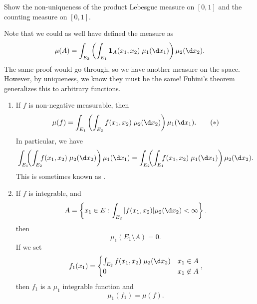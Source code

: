\documentclass[a4paper]{article}
\begin{document}
\begin{ex}
  Show the non-uniqueness of the product Lebesgue measure on $[0, 1]$ and the counting measure on $[0, 1]$.
\end{ex}

Note that we could as well have defined the measure as
\[
  \mu(A) = \int_{E_2} \left(\int_{E_1} \mathbf{1}_A(x_1, x_2)\;\mu_1(\d x_1)\right)\mu_2(\d x_2).
\]
The same proof would go through, so we have another measure on the space. However, by uniqueness, we know they must be the same! Fubini's theorem generalizes this to arbitrary functions.
\begin{thm}\leavevmode
  \begin{enumerate}
    \item If $f$ is non-negative measurable, then
      \[
        \mu(f) = \int_{E_1} \left(\int_{E_2} f(x_1, x_2)\; \mu_2(\d x_2)\right)\mu_1(\d x_1).\tag{$*$}
      \]
      In particular, we have
      \[
        \int_{E_1}\!\!\!\left(\int_{E_2}\!\!\! f(x_1, x_2)\; \mu_2(\d x_2)\right)\mu_1(\d x_1) = \int_{E_2}\!\!\!\left(\int_{E_1}\!\!\!f(x_1, x_2)\; \mu_1(\d x_1)\right)\mu_2(\d x_2).
      \]
      This is sometimes known as .
    \item If $f$ is integrable, and
      \[
        A = \left\{x_1 \in E: \int_{E_2}|f(x_1, x_2)| \mu_2(\d x_2) < \infty\right\}.
      \]
      then
      \[
        \mu_1(E_1 \setminus A) = 0.
      \]
      If we set
      \[
        f_1(x_1) =
        \begin{cases}
          \int_{E_2}f(x_1, x_2) \;\mu_2(\d x_2) & x_1 \in A\\
          0 & x_1 \not\in A
        \end{cases},
      \]
      then $f_1$ is a $\mu_1$ integrable function and
      \[
        \mu_1(f_1) = \mu(f).
      \]
  \end{enumerate}
\end{thm}
\end{document}
